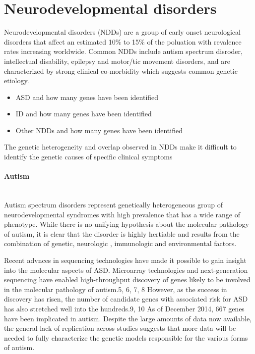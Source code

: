 \documentclass[12pt]{article}
\begin{document}
\section{Neurodevelopmental disorders}

Neurodevelopmental disorders (NDDs) are a group of early onset neurological disorders that affect an estimated 10\% to 15\% of the poluation with revalence rates increasing worldwide.
Common NDDs include autism spectrum disroder, intellectual disability, epilepsy and motor/tic movement disorders, and are characterized by strong clinical co-morbidity which suggests common genetic etiology. 

\begin{itemize}
	\item ASD and how many genes have been identified 
	\item ID and how many genes have been identified 
	\item Other NDDs and how many genes have been identified 
\end{itemize}
The genetic heterogeneity and overlap observed in NDDs make it difficult to identify the genetic causes of specific clinical symptoms

\paragraph{Autism}

~\\ Autism spectrum disorders represent genetically heterogeneous group of neurodevelopmental syndromes with high prevalence that has a wide range of phenotype. While there is no unifying hypothesis about the molecular pathology of autism, it is clear that the disorder is highly hertiable and results from the combination of genetic, neurologic , immunologic and environmental factors. 

Recent advnces in sequencing technologies have made it possible to gain insight into the molecular aspects of ASD. Microarray technologies and next-generation sequencing have enabled high-throughput discovery of genes likely to be involved in the molecular pathology of autism.5, 6, 7, 8 However, as the success in discovery has risen, the number of candidate genes with associated risk for ASD has also stretched well into the hundreds.9, 10 As of December 2014, 667 genes have been implicated in autism. Despite the large amounts of data now available, the general lack of replication across studies suggests that more data will be needed to fully characterize the genetic models responsible for the various forms of autism.
\end{document}
